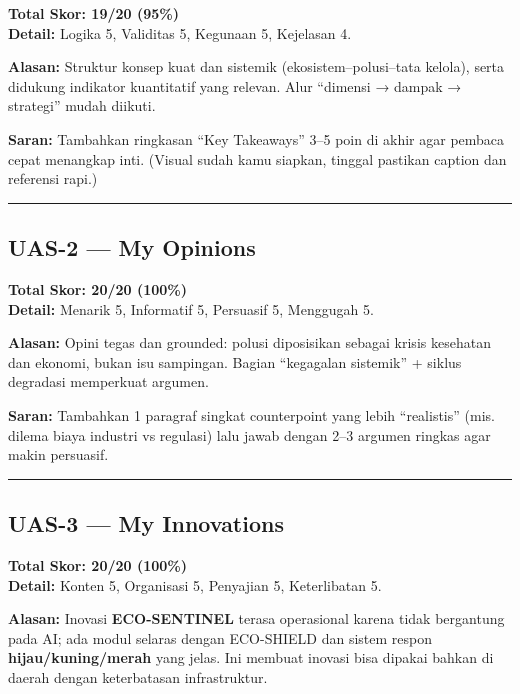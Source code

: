 \documentclass[
  letterpaper,
  DIV=11,
  numbers=noendperiod]{scrreprt}
\begin{document}
\textbf{Total Skor: 19/20 (95\%)}\\
\textbf{Detail:} Logika 5, Validitas 5, Kegunaan 5, Kejelasan 4.

\textbf{Alasan:} Struktur konsep kuat dan sistemik
(ekosistem--polusi--tata kelola), serta didukung indikator kuantitatif
yang relevan. Alur ``dimensi → dampak → strategi'' mudah diikuti.

\textbf{Saran:} Tambahkan ringkasan ``Key Takeaways'' 3--5 poin di akhir
agar pembaca cepat menangkap inti. (Visual sudah kamu siapkan, tinggal
pastikan caption dan referensi rapi.)

\begin{center}\rule{0.5\linewidth}{0.5pt}\end{center}

\subsection{UAS-2 --- My Opinions}\label{uas-2-my-opinions-1}

\textbf{Total Skor: 20/20 (100\%)}\\
\textbf{Detail:} Menarik 5, Informatif 5, Persuasif 5, Menggugah 5.

\textbf{Alasan:} Opini tegas dan grounded: polusi diposisikan sebagai
krisis kesehatan dan ekonomi, bukan isu sampingan. Bagian ``kegagalan
sistemik'' + siklus degradasi memperkuat argumen.

\textbf{Saran:} Tambahkan 1 paragraf singkat counterpoint yang lebih
``realistis'' (mis. dilema biaya industri vs regulasi) lalu jawab dengan
2--3 argumen ringkas agar makin persuasif.

\begin{center}\rule{0.5\linewidth}{0.5pt}\end{center}

\subsection{UAS-3 --- My Innovations}\label{uas-3-my-innovations-1}

\textbf{Total Skor: 20/20 (100\%)}\\
\textbf{Detail:} Konten 5, Organisasi 5, Penyajian 5, Keterlibatan 5.

\textbf{Alasan:} Inovasi \textbf{ECO-SENTINEL} terasa operasional karena
tidak bergantung pada AI; ada modul selaras dengan ECO-SHIELD dan sistem
respon \textbf{hijau/kuning/merah} yang jelas. Ini membuat inovasi bisa
dipakai bahkan di daerah dengan keterbatasan infrastruktur.
\end{document}

